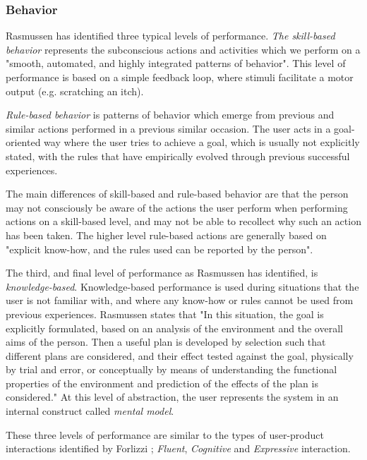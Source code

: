 \subsubsection{Behavior}
Rasmussen \cite{Rasmussen1983} has identified three typical levels of performance. \textit{The skill-based behavior} represents the subconscious actions and activities which we perform on a "smooth, automated, and highly integrated patterns of behavior". This level of performance is based on a simple feedback loop, where stimuli facilitate a motor output (e.g. scratching an itch).

\textit{Rule-based behavior} is patterns of behavior which emerge from previous and similar actions performed in a previous similar occasion. The user acts in a goal-oriented way where the user tries to achieve a goal, which is usually not explicitly stated, with the rules that have empirically evolved through previous successful experiences.

The main differences of skill-based and rule-based behavior are that the person may not consciously be aware of the actions the user perform when performing actions on a skill-based level, and may not be able to recollect why such an action has been taken. The higher level rule-based actions are generally based on "explicit know-how, and the rules used can be reported by the person".

The third, and final level of performance as Rasmussen \cite{Rasmussen1983} has identified, is \textit{knowledge-based}. Knowledge-based performance is used during situations that the user is not familiar with, and where any know-how or rules cannot be used from previous experiences. Rasmussen \cite{Rasmussen1983} states that "In this situation, the goal is explicitly formulated, based on an analysis of the environment and the overall aims of the person. Then a useful plan is developed by selection such that different plans are considered, and their effect tested against the goal, physically by trial and error, or conceptually by means of understanding the functional properties of the environment and prediction of the effects of the plan is considered." At this level of abstraction, the user represents the system in an internal construct called \textit{mental model}.

These three levels of performance are similar to the types of user-product interactions identified by Forlizzi \cite{Forlizzi2004}; \textit{Fluent}, \textit{Cognitive} and \textit{Expressive} interaction.

